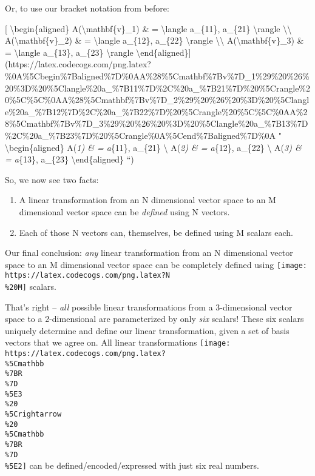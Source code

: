 \documentclass[]{article}
\begin{document}
Or, to use our bracket notation from before:

{[} \textbackslash{}begin\{aligned\} A(\textbackslash{}mathbf\{v\}\_1) \& =
\textbackslash{}langle a\_\{11\}, a\_\{21\} \textbackslash{}rangle
\textbackslash{}\textbackslash{} A(\textbackslash{}mathbf\{v\}\_2) \& =
\textbackslash{}langle a\_\{12\}, a\_\{22\} \textbackslash{}rangle
\textbackslash{}\textbackslash{} A(\textbackslash{}mathbf\{v\}\_3) \& =
\textbackslash{}langle a\_\{13\}, a\_\{23\} \textbackslash{}rangle
\textbackslash{}end\{aligned\}{]}(https://latex.codecogs.com/png.latex?\%0A\%5Cbegin\%7Baligned\%7D\%0AA\%28\%5Cmathbf\%7Bv\%7D\_1\%29\%20\%26\%20\%3D\%20\%5Clangle\%20a\_\%7B11\%7D\%2C\%20a\_\%7B21\%7D\%20\%5Crangle\%20\%5C\%5C\%0AA\%28\%5Cmathbf\%7Bv\%7D\_2\%29\%20\%26\%20\%3D\%20\%5Clangle\%20a\_\%7B12\%7D\%2C\%20a\_\%7B22\%7D\%20\%5Crangle\%20\%5C\%5C\%0AA\%28\%5Cmathbf\%7Bv\%7D\_3\%29\%20\%26\%20\%3D\%20\%5Clangle\%20a\_\%7B13\%7D\%2C\%20a\_\%7B23\%7D\%20\%5Crangle\%0A\%5Cend\%7Baligned\%7D\%0A
" \textbackslash{}begin\{aligned\} A(\emph{1) \& = \langle a}\{11\},
a\_\{21\} \rangle \textbackslash{} A(\emph{2) \& = \langle a}\{12\},
a\_\{22\} \rangle \textbackslash{} A(\emph{3) \& = \langle a}\{13\},
a\_\{23\} \rangle \textbackslash{}end\{aligned\} ``)

So, we now see two facts:

\begin{enumerate}
\def\labelenumi{\arabic{enumi}.}
\tightlist
\item
  A linear transformation from an N dimensional vector space to an M dimensional
  vector space can be \emph{defined} using N vectors.
\item
  Each of those N vectors can, themselves, be defined using M scalars each.
\end{enumerate}

Our final conclusion: \emph{any} linear transformation from an N dimensional
vector space to an M dimensional vector space can be completely defined using
\texttt{[image: https://latex.codecogs.com/png.latex?N\\\%20M]} scalars.

That's right -- \emph{all} possible linear transformations from a 3-dimensional
vector space to a 2-dimensional are parameterized by only \emph{six} scalars!
These six scalars uniquely determine and define our linear transformation, given
a set of basis vectors that we agree on. All linear transformations
\texttt{[image: https://latex.codecogs.com/png.latex?\\\%5Cmathbb\\\%7BR\\\%7D\\\%5E3\\\%20\\\%5Crightarrow\\\%20\\\%5Cmathbb\\\%7BR\\\%7D\\\%5E2]}
can be defined/encoded/expressed with just six real numbers.
\end{document}
